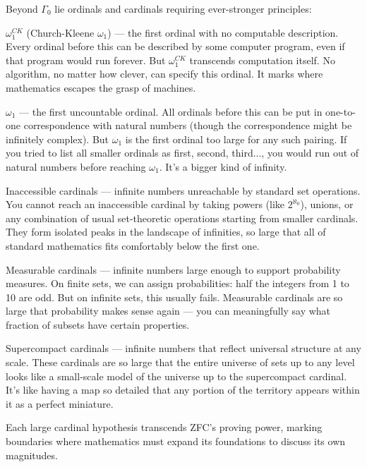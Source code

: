 Beyond $\Gamma_0$ lie ordinals and cardinals requiring ever-stronger principles:

$\omega_1^{CK}$ (Church-Kleene $\omega_1$) — the first ordinal with no computable description. Every ordinal before this can be described by some computer program, even if that program would run forever. But $\omega_1^{CK}$ transcends computation itself. No algorithm, no matter how clever, can specify this ordinal. It marks where mathematics escapes the grasp of machines.

$\omega_1$ — the first uncountable ordinal. All ordinals before this can be put in one-to-one correspondence with natural numbers (though the correspondence might be infinitely complex). But $\omega_1$ is the first ordinal too large for any such pairing. If you tried to list all smaller ordinals as first, second, third..., you would run out of natural numbers before reaching $\omega_1$. It's a bigger kind of infinity.

Inaccessible cardinals — infinite numbers unreachable by standard set operations. You cannot reach an inaccessible cardinal by taking powers (like $2^{\aleph_0}$), unions, or any combination of usual set-theoretic operations starting from smaller cardinals. They form isolated peaks in the landscape of infinities, so large that all of standard mathematics fits comfortably below the first one.

Measurable cardinals — infinite numbers large enough to support probability measures. On finite sets, we can assign probabilities: half the integers from 1 to 10 are odd. But on infinite sets, this usually fails. Measurable cardinals are so large that probability makes sense again — you can meaningfully say what fraction of subsets have certain properties.

Supercompact cardinals — infinite numbers that reflect universal structure at any scale. These cardinals are so large that the entire universe of sets up to any level looks like a small-scale model of the universe up to the supercompact cardinal. It's like having a map so detailed that any portion of the territory appears within it as a perfect miniature.

Each large cardinal hypothesis transcends ZFC's proving power, marking boundaries where mathematics must expand its foundations to discuss its own magnitudes.
